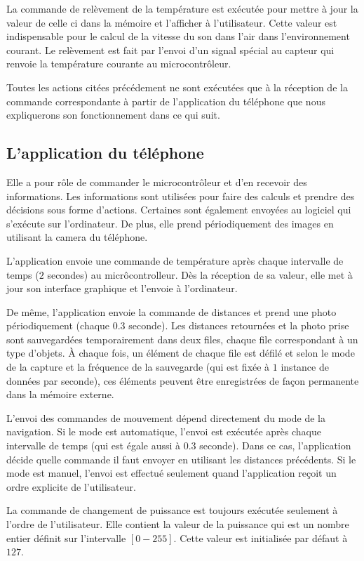 La commande de relèvement de la température est exécutée pour
mettre à jour la valeur de celle ci dans la mémoire et l'afficher à l'utilisateur.
Cette valeur est indispensable pour le calcul de la vitesse du son dans l'air
dans l'environnement courant. Le relèvement est fait par l'envoi d'un signal spécial
au capteur qui renvoie la température courante au microcontrôleur.

Toutes les actions citées précédement ne sont exécutées que à la réception de
la commande correspondante à partir de l'application du téléphone que nous expliquerons
son fonctionnement dans ce qui suit.

\subsection{L'application du téléphone}

Elle a pour rôle de commander
le microcontrôleur et d'en recevoir des informations. Les informations
sont utilisées pour faire des calculs et prendre des décisions sous
forme d'actions. Certaines sont également envoyées au logiciel qui s'exécute sur
l'ordinateur. De plus, elle prend périodiquement des images en utilisant la camera
du téléphone.

L'application envoie une commande de température après chaque intervalle de temps
($2$ secondes) au micrôcontrolleur. Dès la réception de sa valeur, elle met à
jour son interface graphique et l'envoie à l'ordinateur.

De même, l'application envoie la commande de distances et prend une photo périodiquement
(chaque $0.3$ seconde). Les distances retournées et la photo prise sont sauvegardées
temporairement dans deux files, chaque file correspondant à un type d'objets.
\`A chaque fois, un élément de chaque file est défilé et selon le mode
de la capture et la fréquence de la sauvegarde (qui est fixée à $1$ instance de
données par seconde), ces éléments peuvent être enregistrées de façon permanente
dans la mémoire externe.

L'envoi des commandes de mouvement dépend directement du mode de la navigation.
Si le mode est automatique, l'envoi est exécutée après chaque intervalle de temps
(qui est égale aussi à $0.3$ seconde). Dans ce cas, l'application décide quelle
commande il faut envoyer en utilisant les distances précédents.
Si le mode est manuel, l'envoi est effectué seulement quand l'application reçoit
un ordre explicite de l'utilisateur.

La commande de changement de puissance est toujours exécutée seulement
à l'ordre de l'utilisateur. Elle contient la valeur de la puissance qui
est un nombre entier définit sur l'intervalle $[0-255]$. Cette valeur est initialisée
par défaut à $127$.

